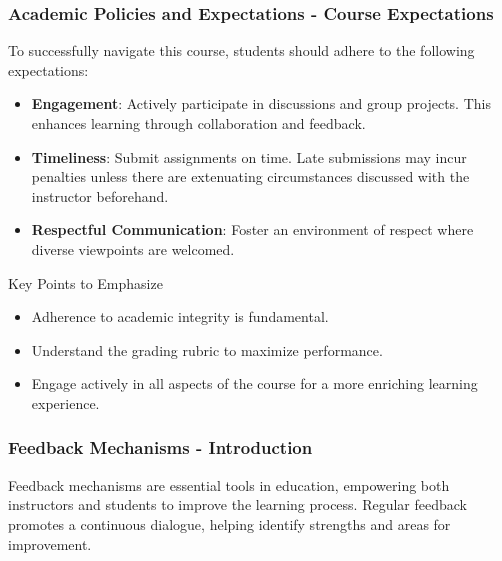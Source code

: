 \documentclass[aspectratio=169]{beamer}
\begin{document}
\begin{frame}[fragile]
    \frametitle{Academic Policies and Expectations - Course Expectations}
    To successfully navigate this course, students should adhere to the following expectations:
    \begin{itemize}
        \item \textbf{Engagement}: Actively participate in discussions and group projects. This enhances learning through collaboration and feedback.
        \item \textbf{Timeliness}: Submit assignments on time. Late submissions may incur penalties unless there are extenuating circumstances discussed with the instructor beforehand.
        \item \textbf{Respectful Communication}: Foster an environment of respect where diverse viewpoints are welcomed.
    \end{itemize}
    
    \begin{block}{Key Points to Emphasize}
        \begin{itemize}
            \item Adherence to academic integrity is fundamental.
            \item Understand the grading rubric to maximize performance.
            \item Engage actively in all aspects of the course for a more enriching learning experience.
        \end{itemize}
    \end{block}
\end{frame}

\begin{frame}[fragile]
    \frametitle{Feedback Mechanisms - Introduction}
    Feedback mechanisms are essential tools in education, empowering both instructors and students to improve the learning process. 
    Regular feedback promotes a continuous dialogue, helping identify strengths and areas for improvement.
\end{frame}
\end{document}

